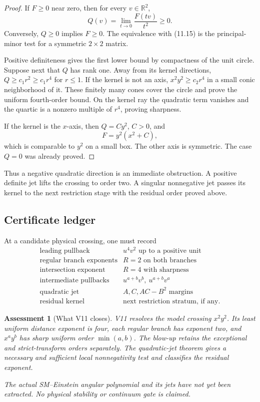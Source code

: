 \documentclass[11pt]{article}
\newtheorem{assessment}[theorem]{Assessment}
\theoremstyle{remark}
\begin{document}
\begin{proof}
If \(F\geq0\) near zero, then for every \(v\in\mathbb R^2\),
\[
 Q(v)=\lim_{t\to0}\frac{F(tv)}{t^2}\geq0.          \tag{11.16}
\]
Conversely, \(Q\geq0\) implies \(F\geq0\).  The equivalence with
(11.15) is the principal-minor test for a symmetric \(2\times2\)
matrix.

Positive definiteness gives the first lower bound by compactness of
the unit circle.  Suppose next that \(Q\) has rank one.  Away from
its kernel directions, \(Q\geq c_1r^2\geq c_1r^4\) for \(r\leq1\).
If the kernel is not an axis, \(x^2y^2\geq c_2r^4\) in a small
conic neighborhood of it.  These finitely many cones cover the
circle and prove the uniform fourth-order bound.  On the kernel ray
the quadratic term vanishes and the quartic is a nonzero multiple
of \(r^4\), proving sharpness.

If the kernel is the \(x\)-axis, then \(Q=C y^2\), \(C>0\), and
\[
 F=y^2(x^2+C),                                     \tag{11.17}
\]
which is comparable to \(y^2\) on a small box.  The other axis is
symmetric.  The case \(Q=0\) was already proved.
\end{proof}

Thus a negative quadratic direction is an immediate obstruction.
A positive definite jet lifts the crossing to order two.  A
singular nonnegative jet passes its kernel to the next restriction
stage with the residual order proved above.

\subsection{Certificate ledger}

At a candidate physical crossing, one must record
\[
\begin{array}{c|c}
\text{leading pullback}&u^4v^2\text{ up to a positive unit}\\
\text{regular branch exponents}&R=2\text{ on both branches}\\
\text{intersection exponent}&R=4\text{ with sharpness}\\
\text{intermediate pullbacks}&u^{a+b}v^b,\ u^{a+b}v^a\\
\text{quadratic jet}&A,C,AC-B^2\text{ margins}\\
\text{residual kernel}&\text{next restriction stratum, if any}.
\end{array}                                                       \tag{11.18}
\]

\begin{assessment}[What V11 closes]
\label{ass:v17v11-status}
V11 resolves the model crossing \(x^2y^2\).  Its least uniform
distance exponent is four, each regular branch has exponent two,
and \(x^ay^b\) has sharp uniform order \(\min(a,b)\).  The blow-up
retains the exceptional and strict-transform orders separately.
The quadratic-jet theorem gives a necessary and sufficient local
nonnegativity test and classifies the residual exponent.

The actual SM--Einstein angular polynomial and its jets have not
yet been extracted.  No physical stability or continuum gate is
claimed.
\end{assessment}
\end{document}
